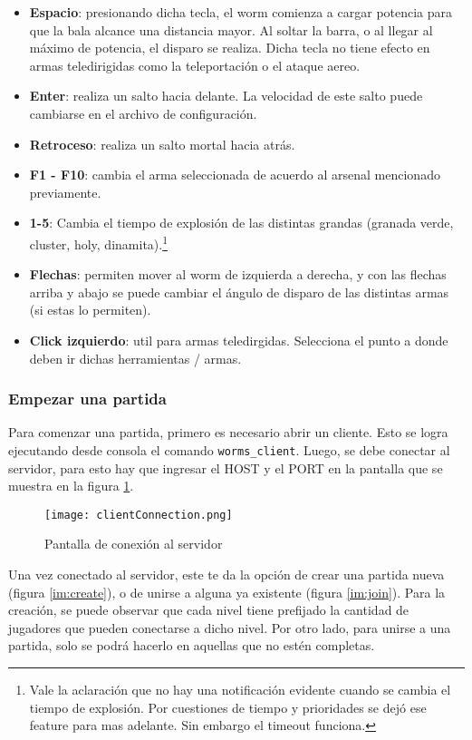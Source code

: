 \begin{itemize}
	\item \textbf{Espacio}: presionando dicha tecla, el worm comienza a cargar potencia para que la bala alcance una distancia mayor. Al soltar la barra, o al llegar al máximo de potencia, el disparo se realiza. Dicha tecla no tiene efecto en armas teledirigidas como la teleportación o el ataque aereo.
	\item \textbf{Enter}: realiza un salto hacia delante. La velocidad de este salto puede cambiarse en el archivo de configuración.
	\item \textbf{Retroceso}: realiza un salto mortal hacia atrás.
	\item \textbf{F1 - F10}: cambia el arma seleccionada de acuerdo al arsenal mencionado previamente.
	\item \textbf{1-5}: Cambia el tiempo de explosión de las distintas grandas (granada verde, cluster, holy, dinamita).\footnote{Vale la aclaración que no hay una notificación evidente cuando se cambia el tiempo de explosión. Por cuestiones de tiempo y prioridades se dejó ese feature para mas adelante. Sin embargo el timeout funciona.}
	\item \textbf{Flechas}: permiten mover al worm de izquierda a derecha, y con las flechas arriba y abajo se puede cambiar el ángulo de disparo de las distintas armas (si estas lo permiten).
	\item \textbf{Click izquierdo}: util para armas teledirgidas. Selecciona el punto a donde deben ir dichas herramientas / armas.
\end{itemize}

\subsubsection{Empezar una partida}
Para comenzar una partida, primero es necesario abrir un cliente. Esto se logra ejecutando desde consola el comando \texttt{worms\_client}. Luego, se debe conectar al servidor, para esto hay que ingresar el HOST y el PORT en la pantalla que se muestra en la figura \ref{im:conec}. 

\begin{figure}[H]
	\centering
	\texttt{[image: clientConnection.png]}
	\caption{Pantalla de conexión al servidor}
	\label{im:conec}
\end{figure}

Una vez conectado al servidor, este te da la opción de crear una partida nueva (figura \ref{im:create}), o de unirse a alguna ya existente (figura \ref{im:join}). Para la creación, se puede observar que cada nivel tiene prefijado la cantidad de jugadores que pueden conectarse a dicho nivel. 
 Por otro lado, para unirse a una partida, solo se podrá hacerlo en aquellas que no estén completas. 
 
